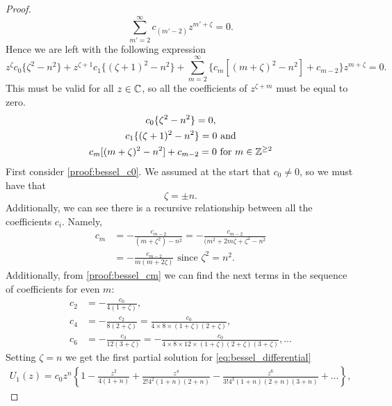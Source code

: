 \begin{proof}
    \begin{equation}
      \sum_{m'=2}^\infty c_{(m'-2)} z^{m' + \zeta} =0.
    \end{equation}
  Hence we are left with the following expression
    \begin{equation}
      z^{\zeta} c_0\{ \zeta^2 - n^2\} + z^{\zeta+1} c_1 \{ (\zeta+1)^2 -n^2\}
      + \sum_{m=2}^\infty \{ c_m [(m+\zeta)^2 -n^2] + c_{m-2} \}z^{m + \zeta} =0.
    \end{equation}
  This must be valid for all $z \in \mathbb{C}$, so all the coefficients of $z^{\zeta +m}$ must be equal to zero.
    \begin{gather}
      c_0\{ \zeta^2 - n^2\} = 0,\label{proof:bessel_c0} \\
      c_1 \{ (\zeta+1)^2 -n^2\} = 0 \label{proof:bessel_c1}\text{ and}\\
      c_m [(m+\zeta)^2 -n^2] + c_{m-2} = 0 \text{ for } m \in \mathbb{Z}^{\geq 2} \label{proof:bessel_cm}
    \end{gather}
  First consider \eqref{proof:bessel_c0}. We assumed at the start that $c_0\neq0$, so we must have that
      \begin{equation}
        \zeta = \pm n.
      \end{equation}
  Additionally, we can see there is a recursive relationship between all the coefficients $c_i$. Namely,
    \begin{align}
      c_m &= - \frac{c_{m-2}}{(m+\zeta^2)-n^2} = - \frac{c_{m-2}}{(m^2 +2m\zeta + \zeta^2 -n^2} \\
      &= - \frac{c_{m-2}}{m(m +2\zeta)} \text{ since } \zeta^2 = n^2.
    \end{align}
  Additionally, from \eqref{proof:bessel_cm} we can find the next terms in the sequence of coefficients for even $m$:
    \begin{align*}
      c_2 &= - \frac{c_0}{4(1+\zeta)}, \\
      c_4 &= - \frac{c_2}{8(2+\zeta)} = \frac{c_0}{4 \times 8 \times (1+\zeta) (2+\zeta)}, \\
      c_6 &= - \frac{c_3}{12(3+\zeta)} = - \frac{c_0}{4 \times 8 \times 12 \times (1+\zeta) (2+\zeta)(3+\zeta)}, ...
    \end{align*}
  Setting $\zeta = n$ we get the first partial solution for \eqref{eq:bessel_differential}
    \begin{align*}
      U_1(z) = c_0z^n \left\{
        1 - \frac{z^2}{4(1+n)} + \frac{z^4}{2!4^2(1+n) (2+n)} - \frac{z^6}{3!4^3(1+n)(2+n)(3+n)} + ...
        \right\},
    \end{align*}

\end{proof}
